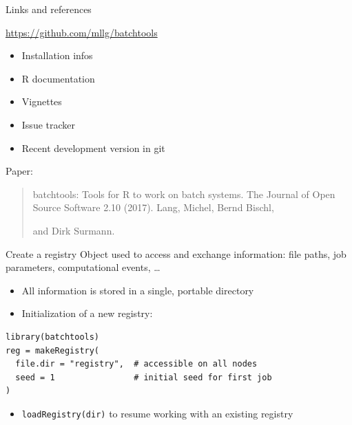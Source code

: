 \documentclass[11pt,compress,t,notes=noshow, aspectratio=169, xcolor=table]{beamer}
\begin{document}
\begin{frame}[fragile]{Links and references}
  \begin{center}
    \url{https://github.com/mllg/batchtools}
  \end{center}
  \begin{itemize}
    \item Installation infos
    \item R documentation
    \item Vignettes
    \item Issue tracker
    \item Recent development version in git
  \end{itemize}
  Paper:
  \begin{quote}
    batchtools: Tools for R to work on batch systems.
    The Journal of Open Source Software 2.10 (2017).
    Lang, Michel, Bernd Bischl,

 and Dirk Surmann.
  \end{quote}
\end{frame}

\begin{frame}[fragile]{Create a registry}
  Object used to access and exchange information: file paths, job parameters, computational events, \ldots
  \begin{itemize}
    \item All information is stored in a single, portable directory
    \item Initialization of a new registry:
  \end{itemize}
  
\begin{lstlisting}
library(batchtools)
reg = makeRegistry(
  file.dir = "registry",  # accessible on all nodes
  seed = 1                # initial seed for first job
)
\end{lstlisting}
  
  \begin{itemize}
    \item \texttt{loadRegistry(dir)} to resume working with an existing registry
  \end{itemize}
\end{frame}
\end{document}
